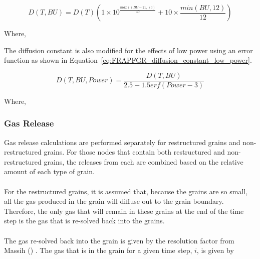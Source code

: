 \begin{equation}
    \label{eq:FRAPFGR_diffusion_constant_nonrestructured_grains}
    D\left( T,BU \right) = D\left( T \right)\left(1 \times 10^{\frac{max\left( (BU - 21,)0 \right)}{40}} + 10 \times \frac{min\left( BU,12 \right)}{12} \right)
\end{equation}

Where,


The diffusion constant is also modified for the effects of low power using an error function as
shown in Equation~\ref{eq:FRAPFGR_diffusion_constant_low_power}.

\begin{equation}
    \label{eq:FRAPFGR_diffusion_constant_low_power}
    D\left( T,BU,Power \right) = \frac{D\left( T,BU \right)}{2.5 - 1.5erf\left( Power - 3 \right)}
\end{equation}

Where,

\subsubsection{Gas Release}\label{section:gas-release-1}

Gas release calculations are performed separately for restructured grains and non-restructured
grains. For those nodes that contain both restructured and non-restructured grains, the releases
from each are combined based on the relative amount of each type of grain.
\\
\\
For the restructured grains, it is assumed that, because the grains are so small, all the gas
produced in the grain will diffuse out to the grain boundary. Therefore, the only gas that will
remain in these grains at the end of the time step is the gas that is re-solved back into the
grains.
\\
\\
The gas re-solved back into the grain is given by the resolution factor from Massih
(\cite{ref:Forsberg1985a}) . The gas that is in the grain for a given time step, \(i\), is given by

